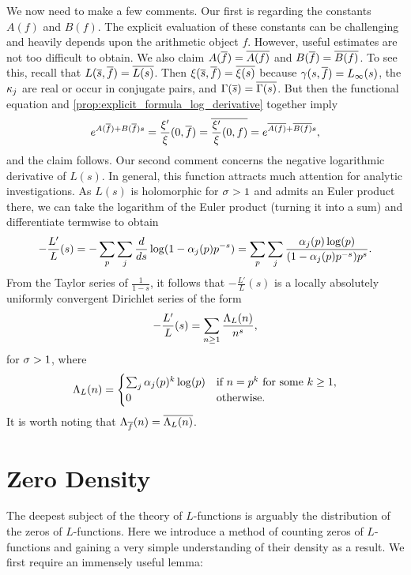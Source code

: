\documentclass[12pt]{article}
\begin{document}
    We now need to make a few comments. Our first is regarding the constants \(A(f)\) and \(B(f)\). The explicit evaluation of these constants can be challenging and heavily depends upon the arithmetic object \(f\). However, useful estimates are not too difficult to obtain. We also claim \(A(\overline{f}) = \overline{A(f)}\) and \(B(\overline{f}) = \overline{B(f)}\). To see this, recall that \(L(\overline{s},\overline{f}) = \overline{L(s)}\). Then \(\xi(\overline{s},\overline{f}) = \overline{\xi(s)}\) because \(\gamma(s,\overline{f}) = L_{\infty}(s)\), the \(\kappa_{j}\) are real or occur in conjugate pairs, and \(\Gamma(\overline{s}) = \overline{\Gamma(s)}\). But then the functional equation and \cref{prop:explicit_formula_log_derivative} together imply
    \[
      e^{A(\overline{f})+B(\overline{f})s} = \frac{\xi'}{\xi}(0,\overline{f}) = \overline{\frac{\xi'}{\xi}(0,f)} = e^{\overline{A(f)}+\overline{B(f)}s},
    \]
    and the claim follows. Our second comment concerns the negative logarithmic derivative of \(L(s)\). In general, this function attracts much attention for analytic investigations. As \(L(s)\) is holomorphic for \(\sigma > 1\) and admits an Euler product there, we can take the logarithm of the Euler product (turning it into a sum) and differentiate termwise to obtain
    \begin{equation}\label{equ:log_derivaive_direct_computation}
      -\frac{L'}{L}(s) = -\sum_{p}\sum_{j}\frac{d}{ds}\log(1-\alpha_{j}(p)p^{-s}) = \sum_{p}\sum_{j}\frac{\alpha_{j}(p)\log(p)}{(1-\alpha_{j}(p)p^{-s})p^{s}}.
    \end{equation}
    From the Taylor series of \(\frac{1}{1-s}\), it follows that \(-\frac{L'}{L}(s)\) is a locally absolutely uniformly convergent Dirichlet series of the form
    \[
       -\frac{L'}{L}(s) = \sum_{n \ge 1}\frac{\Lambda_{L}(n)}{n^{s}},
    \]
    for \(\sigma > 1\), where
    \[
      \Lambda_{L}(n) = \begin{cases} \sum_{j}\alpha_{j}(p)^{k}\log(p) & \text{if \(n = p^{k}\) for some \(k \ge 1\)}, \\ 0 & \text{otherwise}. \end{cases}
    \]
    It is worth noting that \(\Lambda_{\overline{f}}(n) = \overline{\Lambda_{L}(n)}\).
  \section{Zero Density}
    The deepest subject of the theory of \(L\)-functions is arguably the distribution of the zeros of \(L\)-functions. Here we introduce a method of counting zeros of \(L\)-functions and gaining a very simple understanding of their density as a result. We first require an immensely useful lemma:
\end{document}
